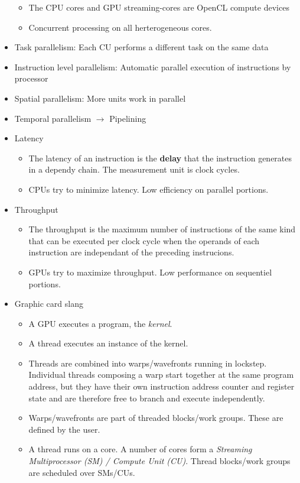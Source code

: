 \documentclass[paper=a4, fontsize=11pt]{scrartcl} %
\numberwithin{equation}{section} %
\numberwithin{figure}{section} %
\numberwithin{table}{section} %
\begin{document}
\begin{itemize}
\begin{itemize}
    \item The CPU cores and GPU streaming-cores are OpenCL compute devices
    \item Concurrent processing on all herterogeneous cores.
  \end{itemize}
  \item Task parallelism: Each CU performs a different task on the same data
  \item Instruction level parallelism: Automatic parallel execution of instructions by processor
  \item Spatial parallelism: More units work in parallel
  \item Temporal parallelism $\rightarrow$ Pipelining
  \item Latency
  \begin{itemize}
    \item The latency of an instruction is the \textbf{delay} that the instruction generates in a dependy chain. The measurement unit is clock cycles.
    \item CPUs try to minimize latency. Low efficiency on parallel portions.
  \end{itemize}
  \item Throughput
  \begin{itemize}
    \item The throughput is the maximum number of instructions of the same kind that can be executed per clock cycle when the operands of each instruction are independant of the preceding instrucions.
    \item GPUs try to maximize throughput. Low performance on sequentiel portions.
  \end{itemize}
  \item Graphic card slang
  \begin{itemize}
    \item A GPU executes a program, the \textit{kernel}.
    \item A thread executes an instance of the kernel.
    \item Threads are combined into warps/wavefronts running in lockstep. Individual threads composing a warp start together at the same program address, but they have their own instruction address counter and register state and are therefore free to branch and execute independently.
    \item Warps/wavefronts are part of threaded blocks/work groups. These are defined by the user.
    \item A thread runs on a core. A number of cores form a \textit{Streaming Multiprocessor (SM) / Compute Unit (CU)}. Thread blocks/work groups are scheduled over SMs/CUs.
  \end{itemize}
\end{itemize}
\end{document}
